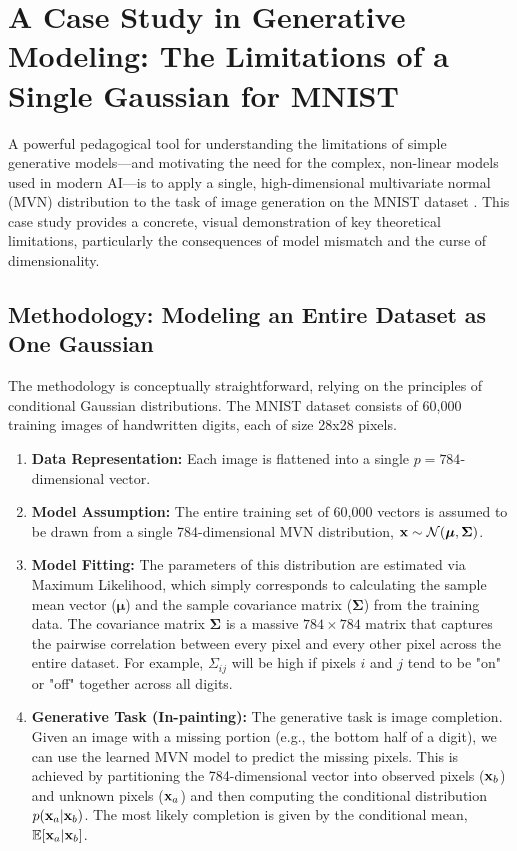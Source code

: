 \section{A Case Study in Generative Modeling: The Limitations of a Single Gaussian for MNIST}
\label{sec:mnist_case_study}

A powerful pedagogical tool for understanding the limitations of simple generative models—and motivating the need for the complex, non-linear models used in modern AI—is to apply a single, high-dimensional multivariate normal (MVN) distribution to the task of image generation on the MNIST dataset \cite{LeCun1998MNIST}. This case study provides a concrete, visual demonstration of key theoretical limitations, particularly the consequences of model mismatch and the curse of dimensionality.

\subsection{Methodology: Modeling an Entire Dataset as One Gaussian}
The methodology is conceptually straightforward, relying on the principles of conditional Gaussian distributions. The MNIST dataset consists of 60,000 training images of handwritten digits, each of size 28x28 pixels.
\begin{enumerate}
    \item \textbf{Data Representation:} Each image is flattened into a single $p=784$-dimensional vector.
    \item \textbf{Model Assumption:} The entire training set of 60,000 vectors is assumed to be drawn from a single 784-dimensional MVN distribution, $\mathbf{x} \sim \mathcal{N}(\boldsymbol{\mu}, \boldsymbol{\Sigma})$.
    \item \textbf{Model Fitting:} The parameters of this distribution are estimated via Maximum Likelihood, which simply corresponds to calculating the sample mean vector ($\boldsymbol{\mu}$) and the sample covariance matrix ($\boldsymbol{\Sigma}$) from the training data. The covariance matrix $\boldsymbol{\Sigma}$ is a massive $784 \times 784$ matrix that captures the pairwise correlation between every pixel and every other pixel across the entire dataset. For example, $\Sigma_{ij}$ will be high if pixels $i$ and $j$ tend to be "on" or "off" together across all digits.
    \item \textbf{Generative Task (In-painting):} The generative task is image completion. Given an image with a missing portion (e.g., the bottom half of a digit), we can use the learned MVN model to predict the missing pixels. This is achieved by partitioning the 784-dimensional vector into observed pixels ($\mathbf{x}_b$) and unknown pixels ($\mathbf{x}_a$) and then computing the conditional distribution $p(\mathbf{x}_a | \mathbf{x}_b)$. The most likely completion is given by the conditional mean, $\mathbb{E}[\mathbf{x}_a | \mathbf{x}_b]$.
\end{enumerate}

